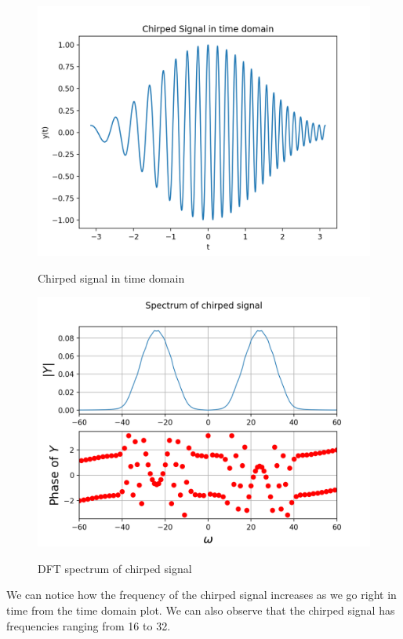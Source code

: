 \documentclass[11pt, a4paper]{article}
\begin{document}
\begin{figure}[H]
   	\centering
   	\includegraphics[scale=0.5]{qn5_t.png}
   	\label{fig:qn5_t}
   	\caption{Chirped signal in time domain}
\end{figure}
\begin{figure}[H]
   	\centering
   	\includegraphics[scale=0.8]{qn5_spec.png}
   	\label{fig:qn5_spec}
   	\caption{DFT spectrum of chirped signal}
\end{figure}
{
We can notice how the frequency of the chirped signal increases as we go right in time from the time domain plot. We can also observe that the chirped signal has frequencies ranging from 16 to 32.
}
\end{document}
